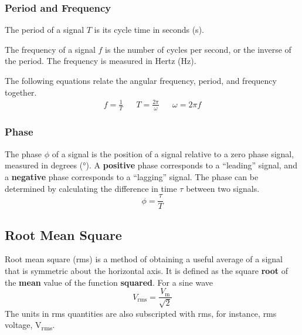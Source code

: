 \documentclass{article}
\begin{document}
\subsubsection{Period and Frequency}
\begin{definition}[Period]
    The period of a signal \(T\) is its cycle time in seconds (\unit{\second}).
\end{definition}
\begin{definition}[Frequency]
    The frequency of a signal \(f\) is the number of cycles per second, or
    the inverse of the period. The frequency is measured in Hertz (\unit{\hertz}).
\end{definition}
The following equations relate the angular frequency, period, and frequency together.
\begin{align*}
    f = \frac{1}{T} &  & T = \frac{2\pi}{\omega} &  & \omega = 2 \pi f
\end{align*}
\subsubsection{Phase}
\begin{definition}
    The phase \(\phi\) of a signal is the position of a signal relative to a zero phase signal,
    measured in degrees (\unit{\degree}). A \textbf{positive} phase corresponds to a ``leading''
    signal, and a \textbf{negative} phase corresponds to a ``lagging'' signal.
    The phase can be determined by calculating the difference in time \(\tau\) between two signals.
    \begin{equation*}
        \phi = \frac{\tau}{T}
    \end{equation*}
\end{definition}
\subsection{Root Mean Square}
\begin{definition}
    Root mean square (rms) is a method of obtaining a useful average of a signal that is symmetric about
    the horizontal axis. It is defined as the square \textbf{root} of the \textbf{mean} value of the
    function \textbf{squared}.
    For a sine wave
    \begin{equation*}
        V_{\mathrm{rms}} = \frac{V_{\mathrm{m}}}{\sqrt{2}}
    \end{equation*}
    The units in rms quantities are also subscripted with rms, for instance, rms voltage, \unit{V_{rms}}.
\end{definition}
\end{document}
